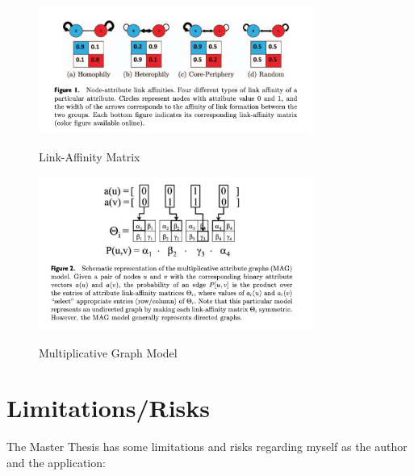 \documentclass[12pt,a4paper]{article}
\begin{document}
	\begin{figure}[h]
		\centering
		\includegraphics[width=0.8\textwidth]{aff_mat.png}
		\caption{Link-Affinity Matrix}
		\cite{kim2012multiplicative}
		\label{Figure 1}
	\end{figure}

	\begin{figure}[h]
		\centering
		\includegraphics[width=0.8\textwidth]{mag.png}
		\caption{Multiplicative Graph Model}
		\cite{kim2012multiplicative}
		\label{Figure 2}
	\end{figure}
	
	\section{Limitations/Risks}

	The Master Thesis has some limitations and risks regarding myself as the author and the application:
\end{document}
